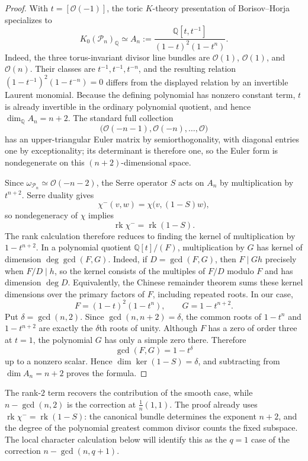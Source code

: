 \documentclass[11pt]{article}
\theoremstyle{plain}
\theoremstyle{definition}
\theoremstyle{remark}
\newcommand{\rk}{\operatorname{rk}}
\newcommand{\Q}{\mathbb Q}
\newcommand{\1}{\mathbf 1}
\begin{document}
\begin{proof}
With $t=[\mathcal O(-1)]$, the toric $K$-theory presentation of Borisov--Horja \cite[Theorem 4.10]{BorisovHorja} specializes to
\[
K_0(\mathcal P_n)_{\Q}
\simeq
A_n:=\frac{\Q[t,t^{-1}]}{(1-t)^2(1-t^n)}.
\]
Indeed, the three torus-invariant divisor line bundles are $\mathcal O(1)$, $\mathcal O(1)$, and $\mathcal O(n)$.  Their classes are $t^{-1},t^{-1},t^{-n}$, and the resulting relation $(1-t^{-1})^2(1-t^{-n})=0$ differs from the displayed relation by an invertible Laurent monomial.
Because the defining polynomial has nonzero constant term, $t$ is already invertible in the ordinary polynomial quotient, and hence $\dim_{\Q}A_n=n+2$.  The standard full collection
\[
\bigl(\mathcal O(-n-1),\mathcal O(-n),\dots,\mathcal O\bigr)
\]
has an upper-triangular Euler matrix by semiorthogonality, with diagonal entries one by exceptionality; its determinant is therefore one, so the Euler form is nondegenerate on this $(n+2)$-dimensional space.

Since $\omega_{\mathcal P_n}\simeq\mathcal O(-n-2)$, the Serre operator $S$ acts on $A_n$ by multiplication by $t^{n+2}$.  Serre duality gives
\[
\chi^-(v,w)=\chi\bigl(v,(1-S)w\bigr),
\]
so nondegeneracy of $\chi$ implies
\[
\rk\chi^-=\rk(1-S).
\]
The rank calculation therefore reduces to finding the kernel of multiplication by $1-t^{n+2}$.  In a polynomial quotient $\Q[t]/(F)$, multiplication by $G$ has kernel of dimension $\deg\gcd(F,G)$.  Indeed, if $D=\gcd(F,G)$, then $F\mid Gh$ precisely when $F/D\mid h$, so the kernel consists of the multiples of $F/D$ modulo $F$ and has dimension $\deg D$.  Equivalently, the Chinese remainder theorem sums these kernel dimensions over the primary factors of $F$, including repeated roots.  In our case,
\[
F=(1-t)^2(1-t^n),
\qquad
G=1-t^{n+2}.
\]
Put $\delta=\gcd(n,2)$.  Since $\gcd(n,n+2)=\delta$, the common roots of $1-t^n$ and $1-t^{n+2}$ are exactly the $\delta$th roots of unity.  Although $F$ has a zero of order three at $t=1$, the polynomial $G$ has only a simple zero there.  Therefore
\[
\gcd(F,G)=1-t^\delta
\]
up to a nonzero scalar.  Hence $\dim\ker(1-S)=\delta$, and subtracting from $\dim A_n=n+2$ proves the formula.
\end{proof}

The rank-$2$ term recovers the contribution of the smooth case, while $n-\gcd(n,2)$ is the correction at $\frac1n(1,1)$.  The proof already uses $\rk\chi^-=\rk(1-S)$: the canonical bundle determines the exponent $n+2$, and the degree of the polynomial greatest common divisor counts the fixed subspace.  The local character calculation below will identify this as the $q=1$ case of the correction $n-\gcd(n,q+1)$.
\end{document}
